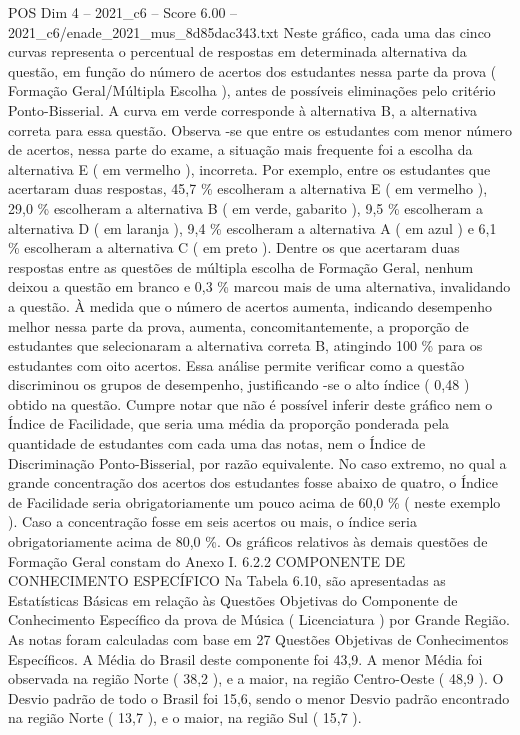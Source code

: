 \begin{textsample}{POS Dim 4 – 2021\_c6 – Score 6.00 – 2021\_c6/enade\_2021\_mus\_8d85dac343.txt}
Neste gráfico, cada uma das cinco curvas representa o percentual de respostas em determinada alternativa da questão, em função do número de acertos dos estudantes nessa parte da prova ( Formação Geral/Múltipla Escolha ), antes de possíveis eliminações pelo critério Ponto-Bisserial.
A curva em verde corresponde à alternativa B, a alternativa correta para essa questão.
Observa -se que entre os estudantes com menor número de acertos, nessa parte do exame, a situação mais frequente foi a escolha da alternativa E ( em vermelho ), incorreta.
Por exemplo, entre os estudantes que acertaram duas respostas, 45,7 \% escolheram a alternativa E ( em vermelho ), 29,0 \% escolheram a alternativa B ( em verde, gabarito ), 9,5 \% escolheram a alternativa D ( em laranja ), 9,4 \% escolheram a alternativa A ( em azul ) e 6,1 \% escolheram a alternativa C ( em preto ).
Dentre os que acertaram duas respostas entre as questões de múltipla escolha de Formação Geral, nenhum deixou a questão em branco e 0,3 \% marcou mais de uma alternativa, invalidando a questão.
À medida que o número de acertos aumenta, indicando desempenho melhor nessa parte da prova, aumenta, concomitantemente, a proporção de estudantes que selecionaram a alternativa correta B, atingindo 100 \% para os estudantes com oito acertos.
Essa análise permite verificar como a questão discriminou os grupos de desempenho, justificando -se o alto índice ( 0,48 ) obtido na questão.
Cumpre notar que não é possível inferir deste gráfico nem o Índice de Facilidade, que seria uma média da proporção ponderada pela quantidade de estudantes com cada uma das notas, nem o Índice de Discriminação Ponto-Bisserial, por razão equivalente.
No caso extremo, no qual a grande concentração dos acertos dos estudantes fosse abaixo de quatro, o Índice de Facilidade seria obrigatoriamente um pouco acima de 60,0 \% ( neste exemplo ).
Caso a concentração fosse em seis acertos ou mais, o índice seria obrigatoriamente acima de 80,0 \%.
Os gráficos relativos às demais questões de Formação Geral constam do Anexo I. 6.2.2 COMPONENTE DE CONHECIMENTO ESPECÍFICO Na Tabela 6.10, são apresentadas as Estatísticas Básicas em relação às Questões Objetivas do Componente de Conhecimento Específico da prova de Música ( Licenciatura ) por Grande Região.
As notas foram calculadas com base em 27 Questões Objetivas de Conhecimentos Específicos.
A Média do Brasil deste componente foi 43,9.
A menor Média foi observada na região Norte ( 38,2 ), e a maior, na região Centro-Oeste ( 48,9 ).
O Desvio padrão de todo o Brasil foi 15,6, sendo o menor Desvio padrão encontrado na região Norte ( 13,7 ), e o maior, na região Sul ( 15,7 ).

\end{textsample}

